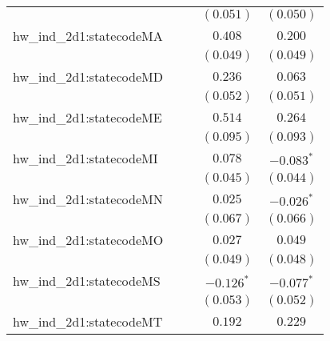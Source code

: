 \begin{center}
\begin{longtable}{l c c c c}
                         &                       &                       & $(0.051)$             & $(0.050)$             \\
hw\_ind\_2d1:statecodeMA &                       &                       & $0.408$               & $0.200$               \\
                         &                       &                       & $(0.049)$             & $(0.049)$             \\
hw\_ind\_2d1:statecodeMD &                       &                       & $0.236$               & $0.063$               \\
                         &                       &                       & $(0.052)$             & $(0.051)$             \\
hw\_ind\_2d1:statecodeME &                       &                       & $0.514$               & $0.264$               \\
                         &                       &                       & $(0.095)$             & $(0.093)$             \\
hw\_ind\_2d1:statecodeMI &                       &                       & $0.078$               & $\mathbf{-0.083}^{*}$ \\
                         &                       &                       & $(0.045)$             & $(0.044)$             \\
hw\_ind\_2d1:statecodeMN &                       &                       & $0.025$               & $\mathbf{-0.026}^{*}$ \\
                         &                       &                       & $(0.067)$             & $(0.066)$             \\
hw\_ind\_2d1:statecodeMO &                       &                       & $0.027$               & $0.049$               \\
                         &                       &                       & $(0.049)$             & $(0.048)$             \\
hw\_ind\_2d1:statecodeMS &                       &                       & $\mathbf{-0.126}^{*}$ & $\mathbf{-0.077}^{*}$ \\
                         &                       &                       & $(0.053)$             & $(0.052)$             \\
hw\_ind\_2d1:statecodeMT &                       &                       & $0.192$               & $0.229$               \\

\end{longtable}
\end{center}
